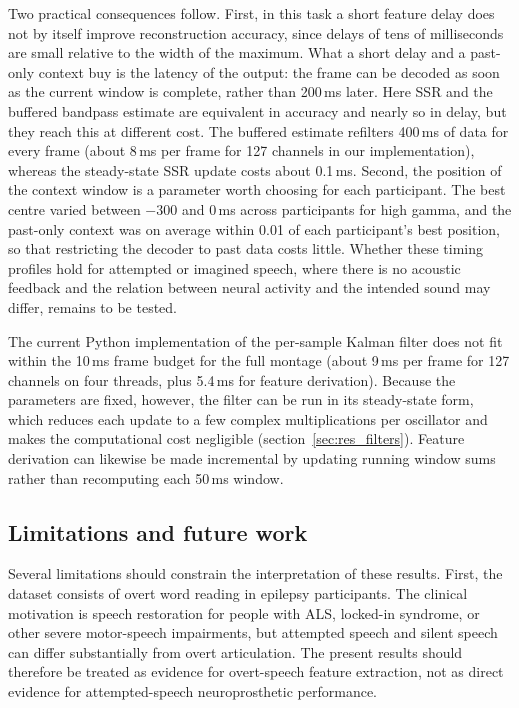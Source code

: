 \documentclass{iopjournal}
\begin{document}
Two practical consequences follow. First, in this task a short feature delay does not by itself improve reconstruction accuracy, since delays of tens of milliseconds are small relative to the width of the maximum. What a short delay and a past-only context buy is the latency of the output: the frame can be decoded as soon as the current window is complete, rather than 200\,ms later. Here SSR and the buffered bandpass estimate are equivalent in accuracy and nearly so in delay, but they reach this at different cost. The buffered estimate refilters 400\,ms of data for every frame (about 8\,ms per frame for 127 channels in our implementation), whereas the steady-state SSR update costs about 0.1\,ms. Second, the position of the context window is a parameter worth choosing for each participant. The best centre varied between $-300$ and $0$\,ms across participants for high gamma, and the past-only context was on average within 0.01 of each participant's best position, so that restricting the decoder to past data costs little. Whether these timing profiles hold for attempted or imagined speech, where there is no acoustic feedback and the relation between neural activity and the intended sound may differ, remains to be tested.

The current Python implementation of the per-sample Kalman filter does not fit within the 10\,ms frame budget for the full montage (about 9\,ms per frame for 127 channels on four threads, plus 5.4\,ms for feature derivation). Because the parameters are fixed, however, the filter can be run in its steady-state form, which reduces each update to a few complex multiplications per oscillator and makes the computational cost negligible (section~\ref{sec:res_filters}). Feature derivation can likewise be made incremental by updating running window sums rather than recomputing each 50\,ms window.

\subsection{Limitations and future work}

Several limitations should constrain the interpretation of these results. First, the dataset consists of overt word reading in epilepsy participants. The clinical motivation is speech restoration for people with ALS, locked-in syndrome, or other severe motor-speech impairments, but attempted speech and silent speech can differ substantially from overt articulation. The present results should therefore be treated as evidence for overt-speech feature extraction, not as direct evidence for attempted-speech neuroprosthetic performance.
\end{document}
